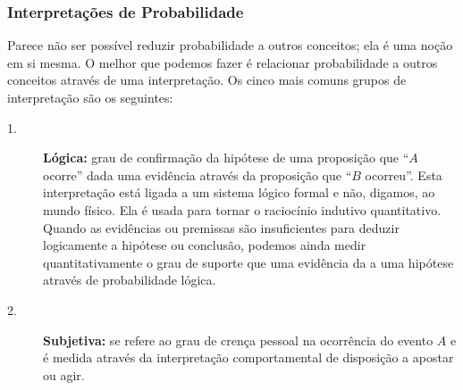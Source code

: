 %
%
%
\begin{frame}
\frametitle{\textbf{Interpretações de Probabilidade}}
\baselineskip=13pt
\begin{block}{}


Parece não ser possível reduzir probabilidade a outros conceitos;
ela é uma noção em si mesma. O melhor que podemos fazer é relacionar
probabilidade a outros conceitos através de uma interpretação. Os
cinco mais comuns grupos de interpretação são os seguintes:

\begin{description}
\item[1.] {\bf Lógica:} grau de confirmação da hipótese de uma proposição que
``$A$ ocorre'' dada uma evidência através da proposição que ``$B$
ocorreu''. Esta interpretação está ligada a um sistema lógico formal
e não, digamos, ao mundo físico.  Ela é usada para tornar o
raciocínio indutivo quantitativo. Quando as evidências ou premissas
são insuficientes para deduzir logicamente a hipótese ou conclusão,
podemos ainda medir quantitativamente o grau de suporte que uma
evidência da a uma hipótese através de probabilidade lógica.

\item[2.] {\bf Subjetiva:} se refere ao grau de crença pessoal na
ocorrência do evento $A$ e é medida através da interpretação
comportamental de disposição a apostar ou agir.

\end{description}

\end{block}
\end{frame}


